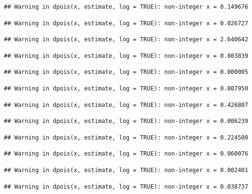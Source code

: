 \documentclass[]{article}
\begin{document}
\begin{verbatim}
## Warning in dpois(x, estimate, log = TRUE): non-integer x = 0.149676
\end{verbatim}

\begin{verbatim}
## Warning in dpois(x, estimate, log = TRUE): non-integer x = 0.026727
\end{verbatim}

\begin{verbatim}
## Warning in dpois(x, estimate, log = TRUE): non-integer x = 2.640642
\end{verbatim}

\begin{verbatim}
## Warning in dpois(x, estimate, log = TRUE): non-integer x = 0.803839
\end{verbatim}

\begin{verbatim}
## Warning in dpois(x, estimate, log = TRUE): non-integer x = 0.000005
\end{verbatim}

\begin{verbatim}
## Warning in dpois(x, estimate, log = TRUE): non-integer x = 0.807950
\end{verbatim}

\begin{verbatim}
## Warning in dpois(x, estimate, log = TRUE): non-integer x = 0.426807
\end{verbatim}

\begin{verbatim}
## Warning in dpois(x, estimate, log = TRUE): non-integer x = 0.006239
\end{verbatim}

\begin{verbatim}
## Warning in dpois(x, estimate, log = TRUE): non-integer x = 0.224500
\end{verbatim}

\begin{verbatim}
## Warning in dpois(x, estimate, log = TRUE): non-integer x = 0.060076
\end{verbatim}

\begin{verbatim}
## Warning in dpois(x, estimate, log = TRUE): non-integer x = 0.002401
\end{verbatim}

\begin{verbatim}
## Warning in dpois(x, estimate, log = TRUE): non-integer x = 0.038737
\end{verbatim}
\end{document}
